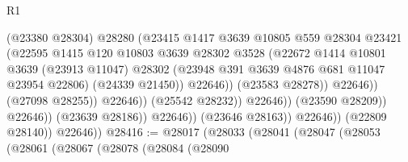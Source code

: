 \begin{lexlean}{R1}
\begin{coremodule}
                                              (@23380 @28304)
                                              @28280
                                              (@23415
                                                @1417
                                                @3639
                                                @10805
                                                @559
                                                @28304
                                                @23421
                                                (@22595
                                                  @1415
                                                  @120
                                                  @10803
                                                  @3639
                                                  @28302
                                                  @3528
                                                  (@22672
                                                    @1414
                                                    @10801
                                                    @3639
                                                    (@23913 @11047)
                                                    @28302
                                                    (@23948
                                                      @391
                                                      @3639
                                                      @4876
                                                      @681
                                                      @11047
                                                      @23954
                                                      @22806)
                                                    (@24339 @21450))
                                                  @22646))
                                              (@23583 @28278))
                                            @22646))
                                        (@27098 @28255))
                                      @22646))
                                  (@25542 @28232))
                                @22646))
                            (@23590 @28209))
                          @22646))
                      (@23639 @28186))
                    @22646))
                (@23646 @28163))
              @22646))
          (@22809 @28140))
        @22646))
@28416 := @28017
    (@28033
      (@28041
        (@28047
          (@28053
            (@28061
              (@28067
                (@28078
                  (@28084
                    (@28090

\end{coremodule}
\end{lexlean}
